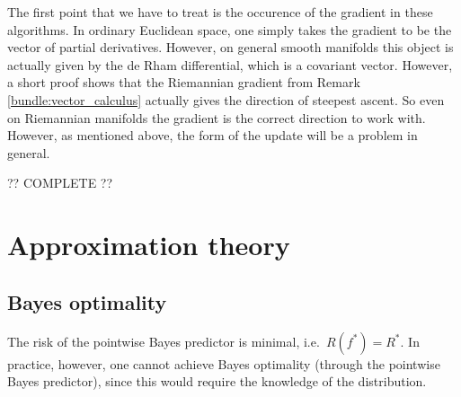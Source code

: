     The first point that we have to treat is the occurence of the gradient in these algorithms. In ordinary Euclidean space, one simply takes the gradient to be the vector of partial derivatives. However, on general smooth manifolds this object is actually given by the de Rham differential, which is a covariant vector. However, a short proof shows that the Riemannian gradient from Remark \ref{bundle:vector_calculus} actually gives the direction of steepest ascent. So even on Riemannian manifolds the gradient is the correct direction to work with. However, as mentioned above, the form of the update will be a problem in general.

    ?? COMPLETE ??

\section{Approximation theory}
\subsection{Bayes optimality}


    \begin{property}
        The risk of the pointwise Bayes predictor is minimal, i.e.~$R(f^*)=R^*$. In practice, however, one cannot achieve Bayes optimality (through the pointwise Bayes predictor), since this would require the knowledge of the distribution.
    \end{property}

